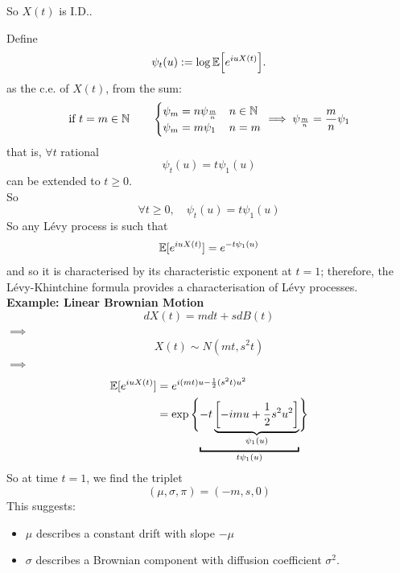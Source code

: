 \documentclass{article}
\begin{document}
	So $X(t)$ is I.D..\par
	Define 
	\[\psi_t(u):=\log\mathbb{E}\Bigl[{e^{iuX(t)}}\Bigr].\]
	as the c.e. of $X(t)$, from the sum:
	\[\text{if }t=m\in\mathbb{N}\qquad\begin{cases}
		\psi_m=n\psi_{\frac{m}{n}} &n\in\mathbb{N}\\
		\psi_m=m\psi_1&n=m
	\end{cases}\implies\psi_{\frac{m}{n}}=\frac{m}{n}\psi_1\]
	that is, $\forall t$ rational 
	\begin{equation*}
		\psi_t(u) = t \psi_1(u)
	\end{equation*}
	can be extended to $t \geqslant 0$. \\
	So
	\begin{equation*}
		\forall t \geqslant 0, \quad \psi_t(u) = t \psi_1(u)
	\end{equation*}
	So any L\'evy process is such that 
	\begin{equation*}
		\mathbb{E}[e^{i u X(t)}] = e^{- t \psi_1(u)}
	\end{equation*}
	and so it is characterised by its characteristic exponent at $t=1$; therefore, the L\'evy-Khintchine formula provides a characterisation of L\'evy processes.\\
	\textbf{Example: Linear Brownian Motion}\\
	\begin{equation*}
		d X(t) = m dt + s dB(t)
	\end{equation*}
	$\implies$
	\begin{equation*}
		X(t) \sim N(mt, s^2 t)
	\end{equation*}
	$\implies$
	\begin{align*}
		\mE[e^{i u X(t)}] &= e^{i (mt) u - \frac{1}{2}(s^2 t) u^2}\\
		&= \exp\Bigg\{{\underbracket{-t\underbrace{\left[-imu + \frac{1}{2}s^2 u^2\right]}_{\psi_1(u)}}_{t \psi_1(u)}}\Bigg\}
	\end{align*}
	So at time $t = 1$, we find the triplet 
	\begin{equation*}
		(\mu, \sigma, \pi) = (-m, s,0)
	\end{equation*}
	This suggests:
	\begin{itemize}
		\item $\mu$ describes a constant drift with slope $ -\mu$
		\item $\sigma$ describes a Brownian component with diffusion coefficient $\sigma^2$. 
	\end{itemize}
\end{document}
